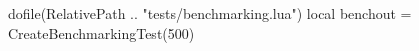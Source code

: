 \documentclass[oneside]{memoir}
\begin{document}
\pagestyle{empty}

\activateBenchmarking

\begin{luacode*}
	dofile(RelativePath .. "tests/benchmarking.lua")
	local benchout = CreateBenchmarkingTest(500)
\end{luacode*}

\PrintRpgTexErrors

\printRpgTexBenchmarking
\end{document}
